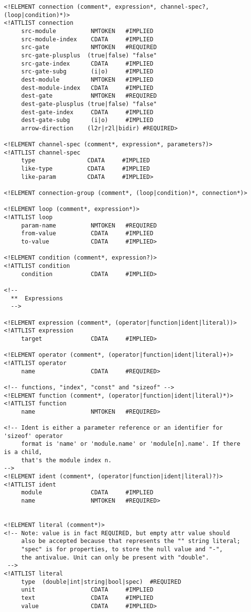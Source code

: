\begin{verbatim}
<!ELEMENT connection (comment*, expression*, channel-spec?, (loop|condition)*)>
<!ATTLIST connection
     src-module          NMTOKEN   #IMPLIED
     src-module-index    CDATA     #IMPLIED
     src-gate            NMTOKEN   #REQUIRED
     src-gate-plusplus  (true|false) "false"
     src-gate-index      CDATA     #IMPLIED
     src-gate-subg       (i|o)     #IMPLIED
     dest-module         NMTOKEN   #IMPLIED
     dest-module-index   CDATA     #IMPLIED
     dest-gate           NMTOKEN   #REQUIRED
     dest-gate-plusplus (true|false) "false"
     dest-gate-index     CDATA     #IMPLIED
     dest-gate-subg      (i|o)     #IMPLIED
     arrow-direction    (l2r|r2l|bidir) #REQUIRED>

<!ELEMENT channel-spec (comment*, expression*, parameters?)>
<!ATTLIST channel-spec
     type               CDATA     #IMPLIED
     like-type          CDATA     #IMPLIED
     like-param         CDATA     #IMPLIED>

<!ELEMENT connection-group (comment*, (loop|condition)*, connection*)>

<!ELEMENT loop (comment*, expression*)>
<!ATTLIST loop
     param-name          NMTOKEN   #REQUIRED
     from-value          CDATA     #IMPLIED
     to-value            CDATA     #IMPLIED>

<!ELEMENT condition (comment*, expression?)>
<!ATTLIST condition
     condition           CDATA     #IMPLIED>

<!--
  **  Expressions
  -->

<!ELEMENT expression (comment*, (operator|function|ident|literal))>
<!ATTLIST expression
     target              CDATA     #IMPLIED>

<!ELEMENT operator (comment*, (operator|function|ident|literal)+)>
<!ATTLIST operator
     name                CDATA     #REQUIRED>

<!-- functions, "index", "const" and "sizeof" -->
<!ELEMENT function (comment*, (operator|function|ident|literal)*)>
<!ATTLIST function
     name                NMTOKEN   #REQUIRED>

<!-- Ident is either a parameter reference or an identifier for 'sizeof' operator
     format is 'name' or 'module.name' or 'module[n].name'. If there is a child,
     that's the module index n.
-->
<!ELEMENT ident (comment*, (operator|function|ident|literal)?)>
<!ATTLIST ident
     module              CDATA     #IMPLIED
     name                NMTOKEN   #REQUIRED>


<!ELEMENT literal (comment*)>
<!-- Note: value is in fact REQUIRED, but empty attr value should
     also be accepted because that represents the "" string literal;
     "spec" is for properties, to store the null value and "-",
     the antivalue. Unit can only be present with "double".
 -->
<!ATTLIST literal
     type  (double|int|string|bool|spec)  #REQUIRED
     unit                CDATA     #IMPLIED
     text                CDATA     #IMPLIED
     value               CDATA     #IMPLIED>


\end{verbatim}
